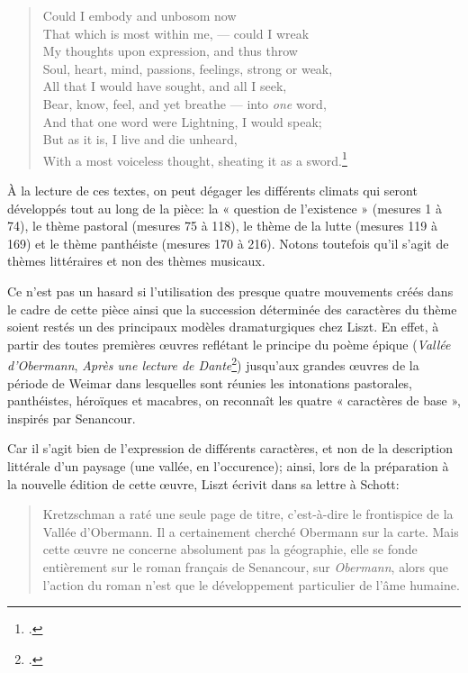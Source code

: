\documentclass[11pt,a4paper]{scrartcl}
\begin{document}
\begin{quote}Could I embody and unbosom now\\
That which is most within me, --- could I wreak\\
My thoughts upon expression, and thus throw\\
Soul, heart, mind, passions, feelings, strong or weak,\\
All that I would have sought, and all I seek,\\
Bear, know, feel, and yet breathe --- into \emph{one} word,\\
And that one word were Lightning, I would speak;\\
But as it is, I live and die unheard,\\
With a most voiceless thought, sheating it as a sword.\footcite[Canto 3 XCVII \emph{in}][]{byron2006}
\end{quote}

À la lecture de ces textes, on peut dégager les différents climats qui seront développés tout au long de la pièce:
la « question de l'existence » (mesures 1 à 74), le thème pastoral (mesures 75 à 118), le thème de la lutte
(mesures 119 à 169) et le thème panthéiste (mesures 170 à 216). Notons toutefois qu'il s'agit de thèmes
littéraires et non des thèmes musicaux.

Ce n'est pas un hasard si l'utilisation des presque quatre mouvements créés dans le cadre de cette pièce ainsi
que la succession déterminée des caractères du thème soient restés un des principaux modèles dramaturgiques
chez Liszt. En effet, à partir des toutes premières \oe{}uvres reflétant le principe du poème épique
(\emph{Vallée d'Obermann}, \emph{Après une lecture de Dante}\footcite{liszt:pelerinage2}) jusqu'aux grandes \oe{}uvres de la période de Weimar
dans lesquelles sont réunies les intonations pastorales, panthéistes, héroïques et macabres, on reconnaît
les quatre « caractères de base », inspirés par Senancour.

Car il s'agit bien de l'expression de différents caractères, et non de la description littérale d'un paysage
(une vallée, en l'occurence); ainsi, lors de la préparation à la nouvelle édition de cette \oe{}uvre,
Liszt écrivit dans sa lettre à Schott: 
\begin{quote}
Kretzschman a raté une seule page de titre, c'est-à-dire le frontispice de la Vallée d'Obermann. Il a certainement cherché Obermann sur la carte. Mais cette \oe{}uvre ne concerne absolument pas la géographie, elle se fonde entièrement sur le roman
français de Senancour, sur \emph{Obermann}, alors que l'action du roman n'est que le développement 
particulier de l'âme humaine.
\end{quote}
\end{document}
